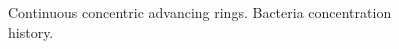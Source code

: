 \begin{figure}
\begin{center}
    \caption{Continuous concentric advancing rings. Bacteria concentration history.\label{fig:bio_concentric_rings_bacteria}}
  \end{center}
\end{figure}

